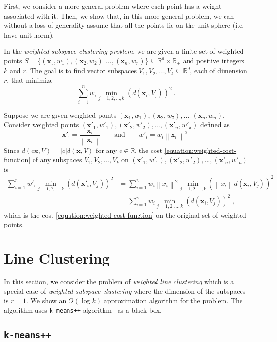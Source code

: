 \documentclass[12pt]{article}
\newcommand{\R}{\mathbb{R}}
\newcommand{\norm}[1]{\left\|#1\right\|}
\newcommand{\x}{\mathbf{x}}
\begin{document}
First, we consider a more general problem where each point has a weight
associated with it. Then, we show that, in this more general problem, we can
without a loss of generality assume that all the points lie on the unit sphere
(i.e. have unit norm).

In the \emph{weighted subspace clustering problem}, we are given a finite set of
weighted points $S = \{ (\x_1, w_1), (\x_2, w_2), \dots, (\x_n, w_n) \}
\subseteq \R^d \times \R_+$ and positive integers $k$ and $r$. The goal is to
find vector subspaces $V_1, V_2, \dots, V_k \subseteq \R^d$, each of dimension
$r$, that minimize
\begin{equation}
\label{equation:weighted-cost-function}
\sum_{i=1}^n w_i \min_{j=1,2,\dots,k} \left(d(\x_i, V_j)\right)^2 \; .
\end{equation}

Suppose we are given weighted points $(\x_1, w_1), (\x_2, w_2), \dots, (\x_n,
w_n)$. Consider weighted points $(\x'_1, w'_1), (\x'_2, w'_2), \dots, (\x'_n,
w'_n)$ defined as
$$
\x'_i = \frac{\x_i}{\norm{\x_i}} \qquad \text{and} \qquad
w'_i = w_i \norm{\x_i}^2 \; .
$$
Since $d(c \x, V) = |c| d(\x,V)$ for any $c \in \R$, the cost
\eqref{equation:weighted-cost-function} of any subspaces $V_1, V_2, \dots, V_k$
on $(\x'_1, w'_1), (\x'_2, w'_2), \dots, (\x'_n, w'_n)$ is
\begin{align*}
\sum_{i=1}^n w'_i \min_{j=1,2,\dots,k} \left(d(\x'_i, V_j)\right)^2
& = \sum_{i=1}^n w_i \norm{x_i}^2 \min_{j=1,2,\dots,k} \left( \norm{x_i} d(\x_i, V_j) \right)^2 \\
& = \sum_{i=1}^n w_i \min_{j=1,2,\dots,k} \left( d(\x_i, V_j) \right)^2 \; ,
\end{align*}
which is the cost \eqref{equation:weighted-cost-function}
on the original set of weighted points.

\section{Line Clustering}
\label{section:line-clustering}

In this section, we consider the problem of \emph{weighted line clustering}
which is a special case of \emph{weighted subspace clustering} where the
dimension of the subspaces is $r=1$. We show an $O(\log k)$ approximation
algorithm for the problem. The algorithm uses \texttt{k-means++}
algorithm~\cite{Arthur-Vassilvitskii-2007} as a black box.

\subsection{\texttt{k-means++}}
\end{document}
